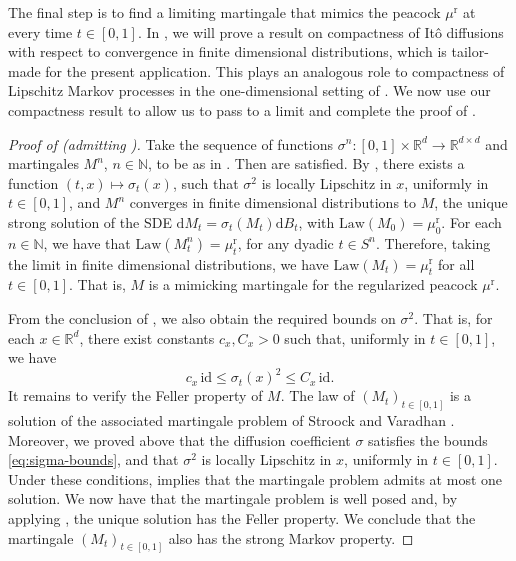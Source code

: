 \documentclass[12pt,oneside]{amsart}
\theoremstyle{definition}
\newcommand{\Law}{\mathrm{Law}}
\newcommand{\id}{\mathrm{id}}
\newcommand{\D}{\mathrm{d}}
\newcommand{\N}{\mathbb N}
\newcommand{\R}{\mathbb R}
\newcommand{\reg}{\mathrm{r}}
\def\R{{\mathbb R}}
\numberwithin{equation}{section}
\begin{document}
The final step is to find a limiting martingale that mimics the peacock $\mu^\reg$ at every time $t \in [0, 1]$. In , we will prove a result on compactness of It\^o diffusions with respect to convergence in finite dimensional distributions, which is tailor-made for the present application. This plays an analogous role to compactness of Lipschitz Markov processes in the one-dimensional setting of \cite{Lo09}. We now use our compactness result to allow us to pass to a limit and complete the proof of .

\begin{proof}[Proof of  (admitting )]
	Take the sequence of functions $\sigma^n\colon [0, 1] \times \R^d \to \R^{d \times d}$ and martingales $M^n$, $n \in \N$, to be as in . Then  are satisfied. By , there exists a function $(t, x) \mapsto \sigma_t(x)$, such that $\sigma^2$ is locally Lipschitz in $x$, uniformly in $t \in [0, 1]$, and $M^n$ converges in finite dimensional distributions to $M$, the unique strong solution of the SDE $\D M_t = \sigma_t(M_t) \D B_t$, with $\Law(M_0) = \mu^\reg_0$. For each $n \in \N$, we have that $\Law(M^n_t) = \mu^\reg_t$, for any dyadic $t \in S^n$. Therefore, taking the limit in finite dimensional distributions, we have $\Law(M_t) = \mu^\reg_t$ for all $t \in [0, 1]$. That is, $M$ is a mimicking martingale for the regularized peacock $\mu^\reg$.
	
	From the conclusion of , we also obtain the required bounds on $\sigma^2$. That is, for each $x \in \R^d$, there exist constants $c_x, C_x > 0$ such that, uniformly in $t \in [0, 1]$, we have
	\begin{equation}\label{eq:sigma-bounds}
		c_x \, \id \leq \sigma_t(x)^2 \leq C_x \, \id.
	\end{equation}
	It remains to verify the Feller property of $M$. The law of $(M_t)_{t \in [0, 1]}$ is a solution of the associated martingale problem of Stroock and Varadhan \cite[Chapter 6]{StVa79}. Moreover, we proved above that the diffusion coefficient $\sigma$ satisfies the bounds \eqref{eq:sigma-bounds}, and that $\sigma^2$ is locally Lipschitz in $x$, uniformly in $t \in [0, 1]$. Under these conditions, \cite[Theorem 10.1.3]{StVa79} implies that the martingale problem admits at most one solution. We now have that the martingale problem is well posed and, by applying \cite[Corollary 10.1.4]{StVa79}, the unique solution has the Feller property. We conclude that the martingale $(M_t)_{t \in [0, 1]}$ also has the strong Markov property.
\end{proof}
\end{document}
